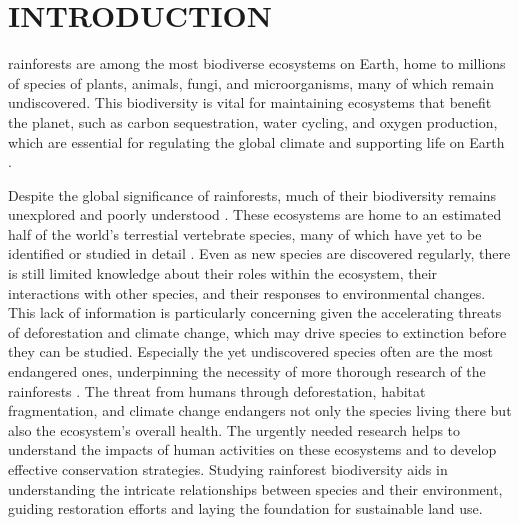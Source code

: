 	\section{INTRODUCTION}
    \label{sec:introduction}
 rainforests are among the most biodiverse ecosystems on Earth, home to millions of species of plants, animals, fungi, and microorganisms, many of which remain undiscovered. This biodiversity is vital for maintaining ecosystems that benefit the planet, such as carbon sequestration, water cycling, and oxygen production, which are essential for regulating the global climate and supporting life on Earth \cite{lewis2015increasing}\cite{stork2007tropical}.

Despite the global significance of rainforests, much of their biodiversity remains unexplored and poorly understood \cite{stork2007tropical}. These ecosystems are home to an estimated half of the world’s terrestial vertebrate species, many of which have yet to be identified or studied in detail \cite{Pillay2022}. Even as new species are discovered regularly, there is still limited knowledge about their roles within the ecosystem, their interactions with other species, and their responses to environmental changes. This lack of information is particularly concerning given the accelerating threats of deforestation and climate change, which may drive species to extinction before they can be studied. Especially the yet undiscovered species often are the most endangered ones, underpinning the necessity of more thorough research of the rainforests \cite{georgLiu2022}.
The threat from humans through deforestation, habitat fragmentation, and climate change endangers not only the species living there but also the ecosystem's overall health. The urgently needed research helps to understand the impacts of human activities on these ecosystems and to develop effective conservation strategies. Studying rainforest biodiversity aids in understanding the intricate relationships between species and their environment, guiding restoration efforts and laying the foundation for sustainable land use.

